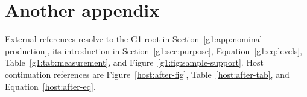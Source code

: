 \documentclass[11pt,letterpaper]{article}
\begin{document}
\section{Another appendix}
\label{host:appendix-b}
External references resolve to the G1 root in Section~\ref{g1:app:nominal-production}, its introduction in Section~\ref{g1:sec:purpose}, Equation~\eqref{g1:eq:levels}, Table~\ref{g1:tab:measurement}, and Figure~\ref{g1:fig:sample-support}. Host continuation references are Figure~\ref{host:after-fig}, Table~\ref{host:after-tab}, and Equation~\eqref{host:after-eq}.
\end{document}
